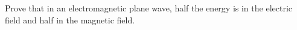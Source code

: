 Prove that in an electromagnetic plane wave, half the energy
is in the electric field and half in the magnetic field.
